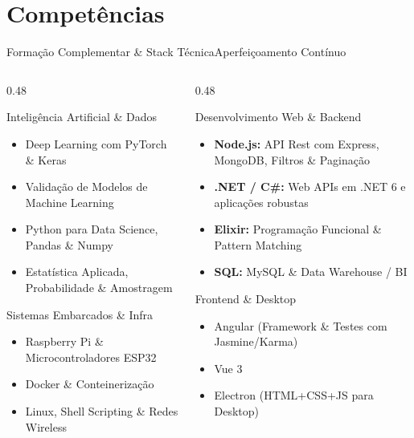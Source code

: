 \documentclass[9pt]{beamer}
\begin{document}
\section{Competências}
\begin{frame}{Formação Complementar \& Stack Técnica}{Aperfeiçoamento Contínuo}
  \begin{columns}[t]
    \begin{column}{0.48\textwidth}
      \begin{block}{Inteligência Artificial \& Dados}
        \begin{itemize}
          \item Deep Learning com PyTorch \& Keras
          \item Validação de Modelos de Machine Learning
          \item Python para Data Science, Pandas \& Numpy
          \item Estatística Aplicada, Probabilidade \& Amostragem
        \end{itemize}
      \end{block}

      \begin{block}{Sistemas Embarcados \& Infra}
        \begin{itemize}
          \item Raspberry Pi \& Microcontroladores ESP32
          \item Docker \& Conteinerização
          \item Linux, Shell Scripting \& Redes Wireless
        \end{itemize}
      \end{block}
    \end{column}

    \begin{column}{0.48\textwidth}
      \begin{block}{Desenvolvimento Web \& Backend}
        \begin{itemize}
          \item \textbf{Node.js:} API Rest com Express, MongoDB, Filtros \& Paginação
          \item \textbf{.NET / C\#:} Web APIs em .NET 6 e aplicações robustas
          \item \textbf{Elixir:} Programação Funcional \& Pattern Matching
          \item \textbf{SQL:} MySQL \& Data Warehouse / BI
        \end{itemize}
      \end{block}

      \begin{block}{Frontend \& Desktop}
        \begin{itemize}
          \item Angular (Framework \& Testes com Jasmine/Karma)
          \item Vue 3
          \item Electron (HTML+CSS+JS para Desktop)
        \end{itemize}
      \end{block}
    \end{column}
  \end{columns}
\end{frame}
\end{document}
